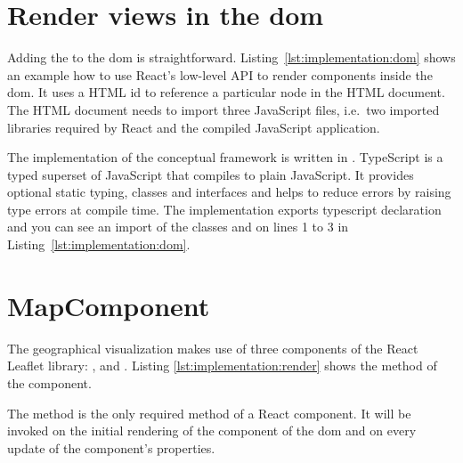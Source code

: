 \section{Render views in the \gls{dom}}

Adding the \gv{} to the \gls{dom} is straightforward.
Listing~\ref{lst:implementation:dom} shows an example how to use React's low-level API to render components inside the \gls{dom}.
It uses a HTML id  to reference a particular node in the HTML document.
The HTML document needs to import three JavaScript files, i.e.\ two imported libraries required by React and the compiled JavaScript application.



The implementation of the conceptual framework is written in .
TypeScript is a typed superset of JavaScript that compiles to plain JavaScript.
It provides optional static typing, classes and interfaces and helps to reduce errors by raising type errors at compile time.
The implementation exports typescript declaration and you can see an import of the classes  and  on lines 1 to 3 in Listing~\ref{lst:implementation:dom}.


\section{MapComponent}

The geographical visualization makes use of three components of the React Leaflet library:
,  and .
Listing \ref{lst:implementation:render} shows the  method of the component.



The  method is the only required method of a React component.
It will be invoked on the initial rendering of the component of the \gls{dom} and on every update of the component's properties.


